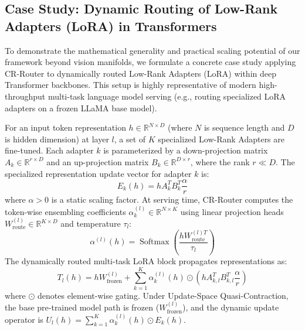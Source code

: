 \subsection{Case Study: Dynamic Routing of Low-Rank Adapters (LoRA) in Transformers}
To demonstrate the mathematical generality and practical scaling potential of our framework beyond vision manifolds, we formulate a concrete case study applying CR-Router to dynamically routed Low-Rank Adapters (LoRA) \cite{hu2021lora} within deep Transformer backbones. This setup is highly representative of modern high-throughput multi-task language model serving (e.g., routing specialized LoRA adapters on a frozen LLaMA base model).

For an input token representation $h \in \mathbb{R}^{N \times D}$ (where $N$ is sequence length and $D$ is hidden dimension) at layer $l$, a set of $K$ specialized Low-Rank Adapters are fine-tuned. Each adapter $k$ is parameterized by a down-projection matrix $A_{k} \in \mathbb{R}^{r \times D}$ and an up-projection matrix $B_{k} \in \mathbb{R}^{D \times r}$, where the rank $r \ll D$. The specialized representation update vector for adapter $k$ is:
\begin{equation}
E_k(h) = h A_k^T B_k^T \frac{\alpha}{r}
\end{equation}
where $\alpha > 0$ is a static scaling factor. At serving time, CR-Router computes the token-wise ensembling coefficients $\alpha_{k}^{(l)} \in \mathbb{R}^{N \times K}$ using linear projection heads $W_{\text{route}}^{(l)} \in \mathbb{R}^{K \times D}$ and temperature $\tau_l$:
\begin{equation}
\alpha^{(l)}(h) = \operatorname{Softmax}\left( \frac{h W_{\text{route}}^{(l)T}}{\tau_l} \right)
\end{equation}
The dynamically routed multi-task LoRA block propagates representations as:
\begin{equation}
T_l(h) = h W_{\text{frozen}}^{(l)} + \sum_{k=1}^K \alpha_{k}^{(l)}(h) \odot \left( h A_{k, l}^T B_{k, l}^T \frac{\alpha}{r} \right)
\end{equation}
where $\odot$ denotes element-wise gating. Under Update-Space Quasi-Contraction, the base pre-trained model path is frozen ($W_{\text{frozen}}^{(l)}$), and the dynamic update operator is $U_l(h) = \sum_{k=1}^K \alpha_k^{(l)}(h) \odot E_k(h)$.

